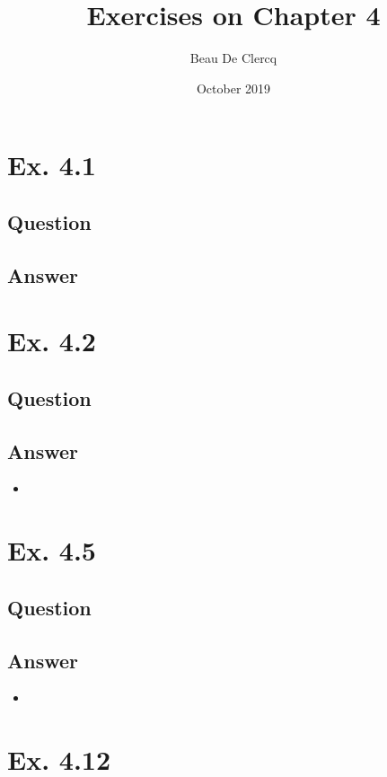 \documentclass[12pt]{article}
\title{Exercises on Chapter 4}
\author{Beau De Clercq}
\date{October 2019}
\begin{document}
\maketitle{}


\clearpage
\newpage

\section*{Ex. 4.1}
\subsection*{Question}

\subsection*{Answer}

\newpage
\section*{Ex. 4.2}
\subsection*{Question}

\subsection*{Answer}
\begin{itemize}
	\item 
\end{itemize}


\newpage
\section*{Ex. 4.5}
\subsection*{Question}

\subsection*{Answer}
\begin{itemize}
	\item 
\end{itemize}

\newpage
\section*{Ex. 4.12}
\end{document}

